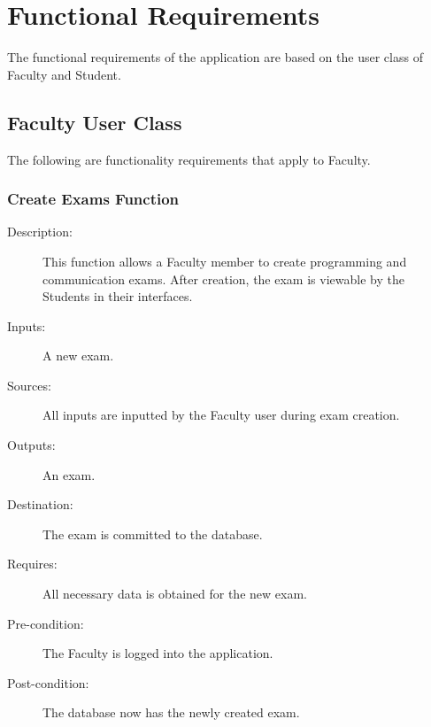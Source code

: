%
%



\section{Functional Requirements}
The functional requirements of the application are based on the user class of
Faculty and Student.
\subsection{Faculty User Class}
The following are functionality requirements that apply to Faculty.
\subsubsection{\large Create Exams Function} 
\begin{boxed} %
\small\begin{description}
\item[Description:]
   This function allows a Faculty member to create programming and communication
   exams. After creation, the exam is viewable by the Students in their
   interfaces.
\item[Inputs:]
   A new exam.
\item[Sources:]
   All inputs are inputted by the Faculty user during exam creation.
\item[Outputs:]
   An exam.
\item[Destination:]
   The exam is committed to the database.
\item[Requires:]
   All necessary data is obtained for the new exam.
\item[Pre-condition:]
   The Faculty is logged into the application.
\item[Post-condition:]
   The database now has the newly created exam.
\end{description}
\normalsize
\end{boxed} %

